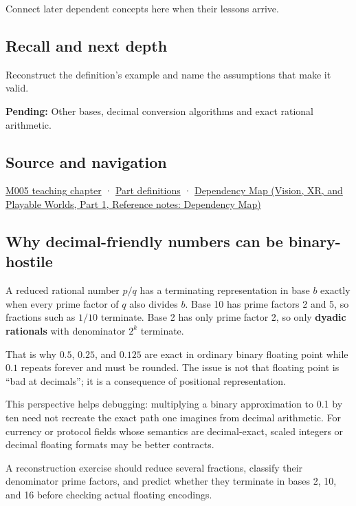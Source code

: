 \hypertarget{appendix-2a2f1b74bdd3-used-by}{}

Connect later dependent concepts here when their lessons arrive.

\subsection{Recall and next depth}\label{appendix-2a2f1b74bdd3-recall-and-next-depth}

\hypertarget{appendix-2a2f1b74bdd3-recall-and-next-depth}{}

Reconstruct the definition's example and name the assumptions that make it valid.

\textbf{Pending:} Other bases, decimal conversion algorithms and exact rational arithmetic.

\subsection{Source and navigation}\label{appendix-2a2f1b74bdd3-source-and-navigation}

\hypertarget{appendix-2a2f1b74bdd3-source-and-navigation}{}

\hyperref[01-foundations-i-ch001-when-arithmetic-meets-uncertainty]{M005 teaching chapter} · \hyperref[appendix-fd090d982a15-m005---parts-77-88]{Part definitions} · \href{../07-Vision-XR-and-Playable-Worlds-P01/main.pdf\#appendix-4ad47bdd269a}{Dependency Map (Vision, XR, and Playable Worlds, Part 1, Reference notes: Dependency Map)}

\subsection{Why decimal-friendly numbers can be binary-hostile}\label{appendix-2a2f1b74bdd3-why-decimal-friendly-numbers-can-be-binary-hostile}

\hypertarget{appendix-2a2f1b74bdd3-why-decimal-friendly-numbers-can-be-binary-hostile}{}

A reduced rational number \(p/q\) has a terminating representation in base \(b\) exactly when every prime factor of \(q\) also divides \(b\). Base 10 has prime factors 2 and 5, so fractions such as \(1/10\) terminate. Base 2 has only prime factor 2, so only \textbf{dyadic rationals} with denominator \(2^k\) terminate.

That is why \(0.5\), \(0.25\), and \(0.125\) are exact in ordinary binary floating point while \(0.1\) repeats forever and must be rounded. The issue is not that floating point is ``bad at decimals''; it is a consequence of positional representation.

This perspective helps debugging: multiplying a binary approximation to 0.1 by ten need not recreate the exact path one imagines from decimal arithmetic. For currency or protocol fields whose semantics are decimal-exact, scaled integers or decimal floating formats may be better contracts.

A reconstruction exercise should reduce several fractions, classify their denominator prime factors, and predict whether they terminate in bases 2, 10, and 16 before checking actual floating encodings.
